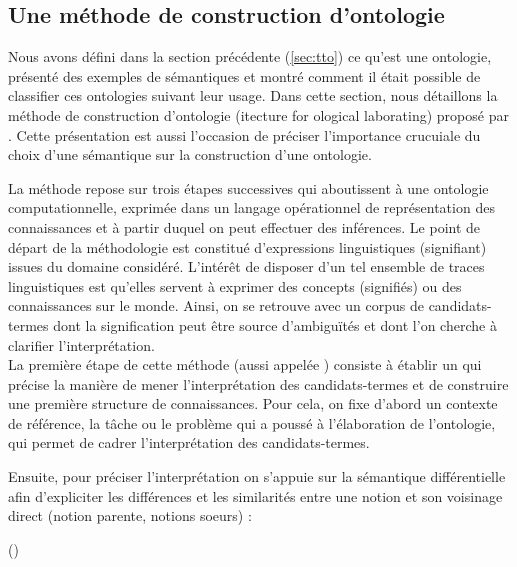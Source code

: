\subsection{Une méthode de construction d'ontologie}\label{sec:construction}
Nous avons défini dans la section précédente (\ref{sec:tto}) ce qu'est une ontologie,  présenté des exemples de sémantiques et montré comment il était possible de classifier ces ontologies suivant leur usage. 
Dans cette section, nous détaillons la méthode de construction d'ontologie  (itecture for ological laborating) proposé par \cite{Bachimont2000a}.
Cette présentation est aussi l'occasion de préciser l'importance crucuiale du choix d'une sémantique sur la construction d'une ontologie.

La méthode repose sur trois étapes successives qui aboutissent à une ontologie computationnelle, exprimée dans un langage opérationnel de représentation des connaissances et à partir duquel on peut effectuer des inférences. 
Le point de départ de la méthodologie est constitué d'expressions linguistiques (signifiant) issues du domaine considéré.
L'intérêt de disposer d'un tel ensemble de traces linguistiques est qu'elles servent à exprimer des concepts (signifiés) ou des connaissances sur le monde. 
Ainsi, on se retrouve avec un corpus de candidats-termes dont la signification peut être source d'ambiguïtés et dont l'on cherche à clarifier l'interprétation.\\

\g{[1.]} La première étape de cette méthode (aussi appelée ) consiste à établir un   qui précise la manière de mener l'interprétation des candidats-termes et de construire une première structure de connaissances. 
Pour cela, on fixe d'abord un contexte de référence, la tâche ou le problème qui a poussé à l'élaboration de l'ontologie, qui permet de cadrer l'interprétation des candidats-termes.

Ensuite, pour préciser l'interprétation on s'appuie sur la sémantique différentielle afin d'expliciter les différences et les similarités entre une notion et son voisinage direct (notion parente, notions soeurs) : 

	 (\cite[p.139]{bachimont:icc})

